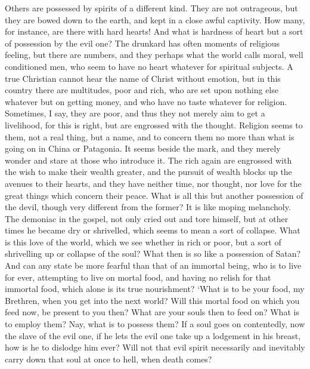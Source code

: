 Others are possessed by spirits of a different
kind. They are not outrageous, but they are bowed down to the earth,
and kept in a close awful captivity. How many, for instance, are there
with hard hearts! And what is hardness of heart but a sort of
possession by the evil one? The drunkard has often moments of
religious feeling, but there are numbers, and they perhaps what the
world calls moral, well conditioned men, who seem to have no heart
whatever for spiritual subjects. A true Christian cannot hear the name
of Christ without emotion, but in this country there are multitudes,
poor and rich, who are set upon nothing else whatever but on getting
money, and who have no taste whatever for religion. Sometimes, I say,
they are poor, and thus they not merely aim to get a livelihood, for
this is right, but are engrossed with the thought. Religion seems to
them, not a real thing, but a name, and to concern them no more than
what is going on in China or Patagonia. It seems beside the mark, and
they merely wonder and stare at those who introduce it. The rich again
are engrossed with the wish to make their wealth greater, and the
pursuit of wealth blocks up the avenues to their hearts, and they have
neither time, nor thought, nor love for the great things which
concern their peace. What is all this but another possession of the
devil, though very different from the former? It is like moping
melancholy. The demoniac in the gospel, not only cried out and tore
himself, but at other times he became dry or shrivelled, which seems
to mean a sort of collapse. What is this love of the world, which we
see whether in rich or poor, but a sort of shrivelling up or collapse
of the soul? What then is so like a possession of Satan? And can any
state be more fearful than that of an immortal being, who is to live
for ever, attempting to live on mortal food, and having no relish for
that immortal food, which alone is its true nourishment? ‘What is to
be your food, my Brethren, when you get into the next world? Will this
mortal food on which you feed now, be present to you then? What are
your souls then to feed on? What is to employ them? Nay, what is to
possess them? If a soul goes on contentedly, now the slave of the evil
one, if he lets the evil one take up a lodgement in his breast, how is
he to dislodge him ever? Will not that evil spirit necessarily and
inevitably carry down that soul at once to hell, when death comes?

